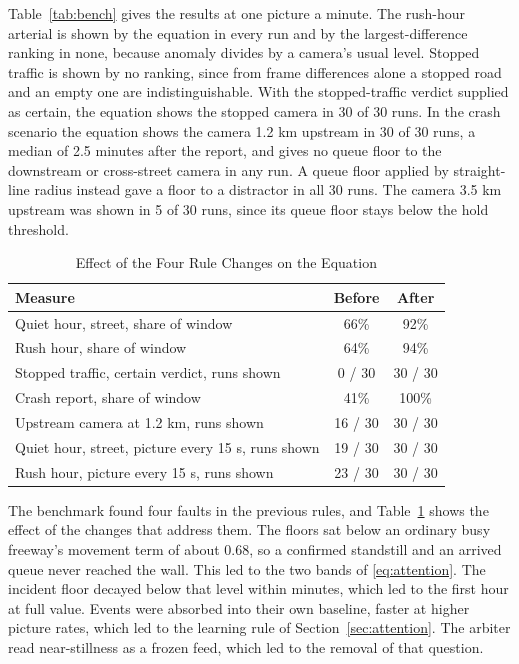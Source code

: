 \documentclass[10pt,journal,compsoc]{IEEEtran}
\begin{document}
Table~\ref{tab:bench} gives the results at one picture a minute. The rush-hour arterial is shown by the equation in every run and by the largest-difference ranking in none, because anomaly divides by a camera's usual level. Stopped traffic is shown by no ranking, since from frame differences alone a stopped road and an empty one are indistinguishable. With the stopped-traffic verdict supplied as certain, the equation shows the stopped camera in 30 of 30 runs. In the crash scenario the equation shows the camera 1.2 km upstream in 30 of 30 runs, a median of 2.5 minutes after the report, and gives no queue floor to the downstream or cross-street camera in any run. A queue floor applied by straight-line radius instead gave a floor to a distractor in all 30 runs. The camera 3.5 km upstream was shown in 5 of 30 runs, since its queue floor stays below the hold threshold.

\begin{table}[!t]
\renewcommand{\arraystretch}{1.2}
\caption{Effect of the Four Rule Changes on the Equation}
\label{tab:beforeafter}
\centering
\begin{tabularx}{\columnwidth}{Xcc}
\toprule
\textbf{Measure} & \textbf{Before} & \textbf{After} \\
\midrule
Quiet hour, street, share of window & 66\% & 92\% \\
Rush hour, share of window & 64\% & 94\% \\
Stopped traffic, certain verdict, runs shown & 0 / 30 & 30 / 30 \\
Crash report, share of window & 41\% & 100\% \\
Upstream camera at 1.2 km, runs shown & 16 / 30 & 30 / 30 \\
Quiet hour, street, picture every 15 s, runs shown & 19 / 30 & 30 / 30 \\
Rush hour, picture every 15 s, runs shown & 23 / 30 & 30 / 30 \\
\bottomrule
\end{tabularx}
\end{table}

The benchmark found four faults in the previous rules, and Table~\ref{tab:beforeafter} shows the effect of the changes that address them. The floors sat below an ordinary busy freeway's movement term of about 0.68, so a confirmed standstill and an arrived queue never reached the wall. This led to the two bands of \eqref{eq:attention}. The incident floor decayed below that level within minutes, which led to the first hour at full value. Events were absorbed into their own baseline, faster at higher picture rates, which led to the learning rule of Section~\ref{sec:attention}. The arbiter read near-stillness as a frozen feed, which led to the removal of that question.
\end{document}
